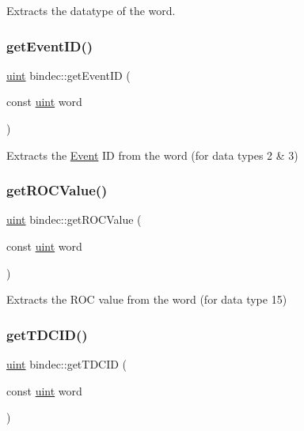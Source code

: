 Extracts the datatype of the word. 

\mbox{\label{namespacebindec_a7164db2f87d4d2cfa12b2cd147d2402d}} 
\subsubsection{\texorpdfstring{get\+Event\+I\+D()}{getEventID()}}
{\footnotesize\ttfamily \hyperlink{namespacebindec_a61700e6ffcfc677215bfdf223803e735}{uint} bindec\+::get\+Event\+ID (\begin{DoxyParamCaption}\item[{const \hyperlink{namespacebindec_a61700e6ffcfc677215bfdf223803e735}{uint}}]{word }\end{DoxyParamCaption})\hspace{0.3cm}{\ttfamily [inline]}}



Extracts the \hyperlink{class_event}{Event} ID from the word (for data types 2 \& 3) 

\mbox{\label{namespacebindec_abfc242c82f0a7301671ec270bce57681}} 
\subsubsection{\texorpdfstring{get\+R\+O\+C\+Value()}{getROCValue()}}
{\footnotesize\ttfamily \hyperlink{namespacebindec_a61700e6ffcfc677215bfdf223803e735}{uint} bindec\+::get\+R\+O\+C\+Value (\begin{DoxyParamCaption}\item[{const \hyperlink{namespacebindec_a61700e6ffcfc677215bfdf223803e735}{uint}}]{word }\end{DoxyParamCaption})\hspace{0.3cm}{\ttfamily [inline]}}



Extracts the R\+OC value from the word (for data type 15) 

\mbox{\label{namespacebindec_a05afce2b4e8802eeb8b452bc1ec6de8b}} 
\subsubsection{\texorpdfstring{get\+T\+D\+C\+I\+D()}{getTDCID()}}
{\footnotesize\ttfamily \hyperlink{namespacebindec_a61700e6ffcfc677215bfdf223803e735}{uint} bindec\+::get\+T\+D\+C\+ID (\begin{DoxyParamCaption}\item[{const \hyperlink{namespacebindec_a61700e6ffcfc677215bfdf223803e735}{uint}}]{word }\end{DoxyParamCaption})\hspace{0.3cm}{\ttfamily [inline]}}




